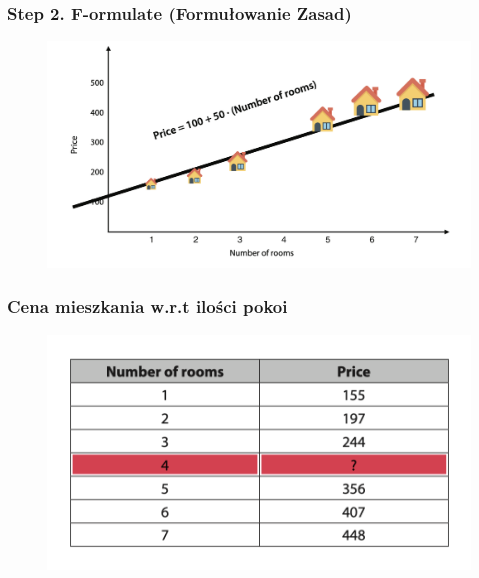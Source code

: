 \documentclass[smaller]{beamer}
\begin{document}
\begin{frame}
\frametitle{Step 2. F-ormulate (Formułowanie Zasad)}
\begin{figure}
    \centering
    \includegraphics[width=\textwidth,height=0.7\textheight,keepaspectratio]{../manifest/estate-formulate.png}
\end{figure}
\end{frame}


\begin{frame}
\frametitle{Cena mieszkania w.r.t ilości pokoi}
\begin{figure}
    \centering
    \includegraphics[width=\textwidth,height=0.7\textheight,keepaspectratio]{../manifest/estate-data.png}
\end{figure}
\end{frame}

\end{document}
